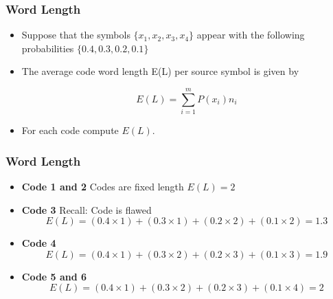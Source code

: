 \documentclass[a4]{beamer}
\begin{document}
\begin{frame}
\frametitle{Word Length}
\begin{itemize}
\item Suppose that the symbols $\{x_1, x_2, x_3, x_4\}$ appear with the following probabilities $\{0.4, 0.3, 0.2, 0.1\}$
\item The average code word length E(L) per source symbol is given by

\[ E(L) = \sum ^{m}_{i=1} P(x_i) n_i \]
\item For each code compute $E(L)$.
\end{itemize}
\end{frame}

\begin{frame}
\frametitle{Word Length}
\begin{itemize}
\item \textbf{Code 1 and 2} Codes are fixed length $ E(L) = 2 $
\item \textbf{Code 3} Recall: Code is flawed \[ E(L) = (0.4 \times 1)+(0.3 \times 1)+(0.2 \times 2)+(0.1 \times 2) = 1.3 \]
\item \textbf{Code 4 } \[ E(L) = (0.4 \times 1)+(0.3 \times 2)+(0.2 \times 3)+(0.1 \times 3) = 1.9 \]
\item \textbf{Code 5 and 6} \[ E(L) = (0.4 \times 1)+(0.3 \times 2)+(0.2 \times 3)+(0.1 \times 4) = 2 \]
\end{itemize}
\end{frame}
\end{document}
